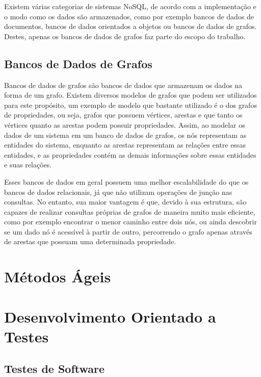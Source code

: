 Existem várias categorias de sistemas NoSQL, de acordo com a implementação e o modo como os dados são armazenados, como por exemplo bancos de dados de documentos, bancos de dados orientados a objetos ou bancos de dados de grafos.
Destes, apenas os bancos de dados de grafos faz parte do escopo do trabalho.

\subsection{Bancos de Dados de Grafos}


Bancos de dados de grafos são bancos de dados que armazenam os dados na forma de um grafo. Existem diversos modelos de grafos que podem ser utilizados para este propósito, um exemplo de modelo que bastante utilizado é o dos grafos de propriedades, ou seja, grafos que possuem vértices, arestas e que tanto os vértices quanto as arestas podem possuir propriedades.
Assim, ao modelar os dados de um sistema em um banco de dados de grafos, os nós representam as entidades do sistema, enquanto as arestas representam as relações entre essas entidades, e as propriedades contém as demais informações sobre essas entidades e suas relações.


Esses bancos de dados em geral possuem uma melhor escalabilidade do que os bancos de dados relacionais, já que não utilizam operações de junção nas consultas.
No entanto, sua maior vantagem é que, devido à sua estrutura, são capazes de realizar consultas próprias de grafos de maneira muito mais eficiente, como por exemplo encontrar o menor caminho entre dois nós, ou ainda descobrir se um dado nó é acessível à partir de outro, percorrendo o grafo apenas através de arestas que possuam uma determinada propriedade.


\section{Métodos Ágeis}

\section{Desenvolvimento Orientado a Testes}\label{fun:tdd}

\subsection{Testes de Software}

